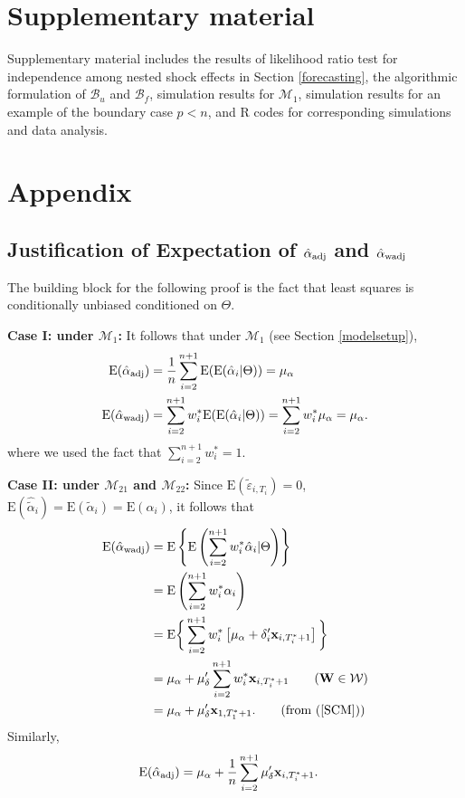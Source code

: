 \documentclass[11pt,3p,review,authoryear]{elsarticle}
\def\mbf#1{\mathbf{#1}} %
\def\mrm#1{\mathrm{#1}} %
\def\mc#1{\mathcal{#1}} %
\def\E#1{\mathrm{E}(#1)} %
\theoremstyle{definition}
\begin{document}
\section{Supplementary material}

Supplementary material includes the results of  likelihood ratio test for  independence among nested shock effects in Section \ref{forecasting}, the algorithmic formulation of $\mc{B}_u$ and $\mc{B}_f$, simulation results for $\mc{M}_1$, simulation results for an example of the boundary case $p < n$, and R codes for corresponding simulations and data analysis.


  
\section{Appendix}
\label{proofs}

\subsection{Justification of Expectation of $\hat{\alpha}_{\rm adj}$ and $\hat{\alpha}_{\rm wadj}$}
\label{exp}

The building block for the following proof is the fact that least squares is conditionally unbiased conditioned on $\Theta$. 

\noindent \textbf{Case I: under $\mc{M}_{1}$:} It follows that  under $\mc{M}_{1}$ (see Section \ref{modelsetup}),
\begin{align*}
\E{\hat{\alpha}_{\rm adj}} &=\frac{1}{n}  \sum_{i=2}^{n+1} \E{\E{\hat{\alpha}_i|\Theta}} = \mu_{\alpha} \\
 \E{\hat{\alpha}_{\rm wadj}}&= \sum_{i=2}^{n+1} w_i^* \E{\E{\hat{\alpha}_i|\Theta}}= \sum_{i=2}^{n+1} w_i^*\mu_{\alpha}= \mu_{\alpha}.
\end{align*}
where we used the fact that $\sum_{i=2}^{n+1} w^*_i=1$. 

\noindent \textbf{Case II: under $\mc{M}_{21}$ and $\mc{M}_{22}$:} Since $\E{\tilde{\varepsilon}_{i, T_i}}=0$, $\E{\hat{\tilde{\alpha}}_{i}}=\E{\tilde{\alpha}_{i}}=\E{\alpha_{i}}$, it follows that
  \begin{align*}
   \E{\hat{\alpha}_{\rm wadj}}
   &= \mrm{E}\left\{\mrm{E}\left(\sum_{i=2}^{n+1} w_i^*\hat{\alpha}_i|\Theta\right)\right\}\\
   &= \mrm{E}\left( \sum_{i=2}^{n+1} w_i^*\alpha_i\right)\\
   &= \mrm{E}\bigg\{ \sum_{i=2}^{n+1} w_i^*\left[\mu_{\alpha}+\delta_{i}'\mbf{x}_{i, T_i^*+1}\right]\bigg\}\\
   &=\mu_{\alpha}+ \mu_{\delta}' \sum_{i=2}^{n+1} w_i^*\mbf{x}_{i, T_i^*+1}\tag{$\mbf{W}\in \mc{W}$}
   \\
   &=\mu_{\alpha}+  \mu_{\delta}'\mbf{x}_{1, T_1^*+1}. \tag{from (\ref{SCM})}
   \end{align*}
Similarly,
  \begin{align*}
   \E{\hat{\alpha}_{\rm adj}}
   &=\mu_{\alpha}+\frac{1}{n}\sum_{i=2}^{n+1} \mu_{\delta}'  \mbf{x}_{i, T_i^*+1}.
   \end{align*}
\end{document}
